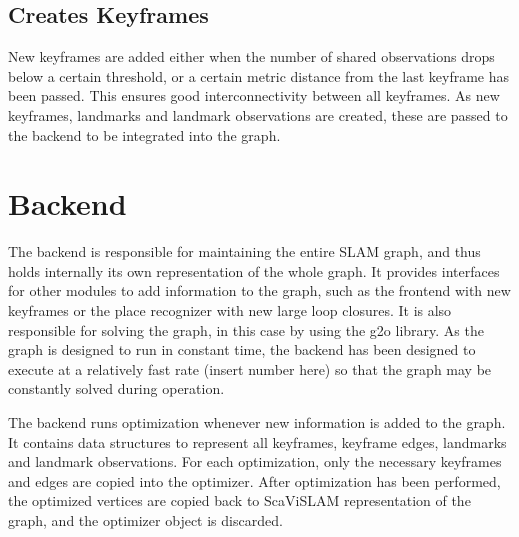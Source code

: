\subsection{Creates Keyframes}

New keyframes are added either when the number of shared observations drops below a certain threshold, or a certain metric distance from the last keyframe has been passed.  This ensures good interconnectivity between all keyframes.  As new keyframes, landmarks and landmark observations are created, these are passed to the backend to be integrated into the graph.

\section{Backend}
\label{sec:scavislam_backend}

The backend is responsible for maintaining the entire SLAM graph, and thus holds internally its own representation of the whole graph.  It provides interfaces for other modules to add information to the graph, such as the frontend with new keyframes or the place recognizer with new large loop closures. It is also responsible for solving the graph, in this case by using the g2o library\cite{g2o}. As the graph is designed to run in constant time, the backend has been designed to execute at a relatively fast rate (insert number here) so that the graph may be constantly solved during operation.


The backend runs optimization whenever new information is added to the graph.  It contains data structures to represent all keyframes, keyframe edges, landmarks and landmark observations.  For each optimization, only the necessary keyframes and edges are copied into the optimizer.  After optimization has been performed, the optimized vertices are copied back to ScaViSLAM representation of the graph, and the optimizer object is discarded.

